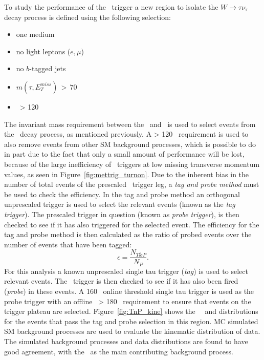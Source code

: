 	 To study the performance of the \met\ trigger a new region to isolate the $W\rightarrow\tau\nu_{\tau}$ decay process is defined using the following selection:
	 \begin{itemize}
	 \item one medium \ltau\
	 \item no light leptons ($e,\mu$)
	 \item no $b$-tagged jets
	 \item $m(\tau,E_T^{miss})\,>\,70$ \gev\	
	 \item \met\ > 120 \gev\
	 \end{itemize}
	 The invariant mass requirement between the \met\ and \ltau\ is used to select events from the \Wjets\ decay process, as mentioned previously. A \met > 120 \gev\ requirement is used to also remove events from other \ac{SM} background processes, which is possible to do in part due to the fact that only a small amount of performance will be lost, because of the large inefficiency of \met\ triggers at low missing transverse momentum values, as seen in Figure~\ref{fig:mettrig_turnon}. 
	Due to the inherent bias in the number of total events of the prescaled \met\ trigger leg, a \textit{tag and probe method} must be used to check the efficiency.
	In the tag and probe method an orthogonal unprescaled trigger is used to select the relevant events (known as the \textit{tag trigger}). The prescaled trigger in question (known as \textit{probe trigger}), is then checked to see if it has also triggered for the selected event. 
	The efficiency for the tag and probe method is then calculated as the ratio of probed events over the number of events that have been tagged: 
	\begin{equation}
	\epsilon=\frac{N_{T\&P}}{N_{P}}.
	\label{eq:TnP_eff}
	\end{equation}
	For this analysis a known unprescaled single tau trigger (\textit{tag}) is used to select relevant events. 
	The \met\ trigger is then checked to see if it has also been fired (\textit{probe}) in these events. 
	A 160 \gev\ online threshold single tau trigger is used as the probe trigger with an offline \pt\ > 180 \gev\ requirement to ensure that events on the trigger plateau are selected. 
	 Figure~\ref{fig:TnP_kine} shows the \ltau\ \pt\ and \met distributions for the events that pass the tag and probe selection in this region.
	 \ac{MC} simulated \ac{SM} background processes are used to evaluate the kinematic distribution of data.
	  The simulated background processes and data distributions are found to have good agreement, with the \Wjets\ as the main contributing background process. 
	 \metTrigKine
	 
